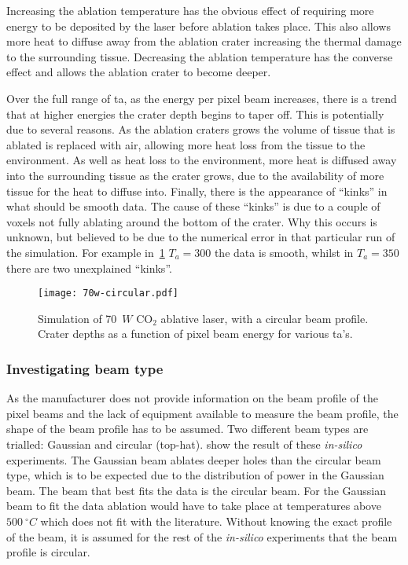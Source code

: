 Increasing the ablation temperature has the obvious effect of requiring more energy to be deposited by the laser before ablation takes place. This also allows more heat to diffuse away from the ablation crater increasing the thermal damage to the surrounding tissue. Decreasing the ablation temperature has the converse effect and allows the ablation crater to become deeper.

Over the full range of \gls*{ta}, as the energy per pixel beam increases, there is a trend that at higher energies the crater depth begins to taper off. This is potentially due to several reasons. As the ablation craters grows the volume of tissue that is ablated is replaced with air, allowing more heat loss from the tissue to the environment. As well as heat loss to the environment, more heat is diffused away into the surrounding tissue as the crater grows, due to the availability of more tissue for the heat to diffuse into.
Finally, there is the appearance of ``kinks'' in what should be smooth data.
The cause of these ``kinks'' is due to a couple of voxels not fully ablating around the bottom of the crater.
Why this occurs is unknown, but believed to be due to the numerical error in that particular run of the simulation.
For example in~\cref{fig:tacirc} $T_a=300$ the data is smooth, whilst in $T_a=350$ there are two unexplained ``kinks''.

\begin{figure}[!htbp]
	\centering
    \texttt{[image: 70w-circular.pdf]}
    \caption{Simulation of 70~$W$ CO$_2$ ablative laser, with a circular beam profile. Crater depths as a function of pixel beam energy for various \gls*{ta}'s.}
    \label{fig:tacirc}
\end{figure}
 


\subsubsection*{Investigating beam type}

As the manufacturer does not provide information on the beam profile of the pixel beams and the lack of equipment available to measure the beam profile, the shape of the beam profile has to be assumed. Two different beam types are trialled: Gaussian and circular (top-hat).  show the result of these \textit{in-silico} experiments. The Gaussian beam ablates deeper holes than the circular beam type, which is to be expected due to the distribution of power in the Gaussian beam. The beam that best fits the data is the circular beam. For the Gaussian beam to fit the data ablation would have to take place at temperatures above $500~^{\circ}C$ which does not fit with the literature. Without knowing the exact profile of the beam, it is assumed for the rest of the \textit{in-silico} experiments that the beam profile is circular.


